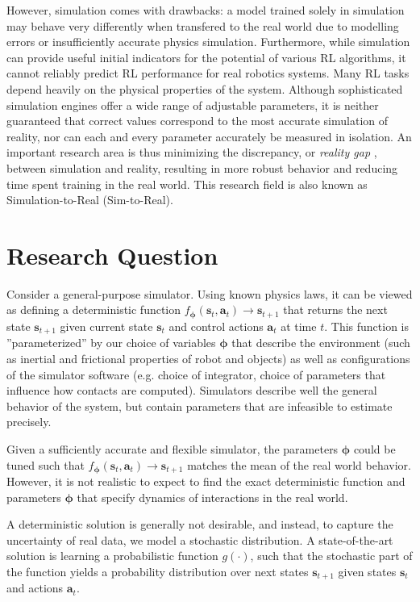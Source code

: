 \documentclass{kththesis}
\newcommand{\vph}{\boldsymbol{\phi}}
\newcommand{\vs}{\pmb{s}_t}
\newcommand{\va}{\pmb{a}_t}
\newcommand{\vns}{\pmb{s}_{t+1}}
\begin{document}
However, simulation comes with drawbacks: a model trained solely in simulation may behave very differently when transfered to the real world due to modelling errors or insufficiently accurate physics simulation. Furthermore, while simulation can provide useful initial indicators for the potential of various RL algorithms, it cannot reliably predict RL performance for real robotics systems. Many RL tasks depend heavily on the physical properties of the system. Although sophisticated simulation engines offer a wide range of adjustable parameters, it is neither guaranteed that correct values correspond to the most accurate simulation of reality, nor can each and every parameter accurately be measured in isolation. An important research area is thus minimizing the discrepancy, or \emph{reality gap} \parencite{Jakobi1995NoiseAT}, between simulation and reality, resulting in more robust behavior and reducing time spent training in the real world. This research field is also known as Simulation-to-Real (Sim-to-Real).

\section{Research Question}

Consider a general-purpose simulator. Using known physics laws, it can be viewed as defining a deterministic function $f_{\vph}(\vs, \va) \rightarrow \vns$ that returns the next state $\vns$ given current state $\vs$ and control actions $\va$ at time $t$. This function is ''parameterized'' by our choice of variables $\vph$ that describe the environment (such as inertial and frictional properties of robot and objects) as well as configurations of the simulator software (e.g. choice of integrator, choice of parameters that influence how contacts are computed). Simulators describe well the general behavior of the system, but contain parameters that are infeasible to estimate precisely.%

Given a sufficiently accurate and flexible simulator, the parameters $\vph$ could be tuned such that $f_{\vph}(\vs, \va) \rightarrow \vns$ matches the mean of the real world behavior. However, it is not realistic to expect to find the exact deterministic function and parameters $\vph$ that specify dynamics of interactions in the real world.

A deterministic solution is generally not desirable, and instead, to capture the uncertainty of real data, we model a stochastic distribution. A state-of-the-art solution is learning a probabilistic function $g(\cdot)$, such that the stochastic part of the function yields a probability distribution over next states $\vns$ given states $\vs$ and actions $\va$.
\end{document}
